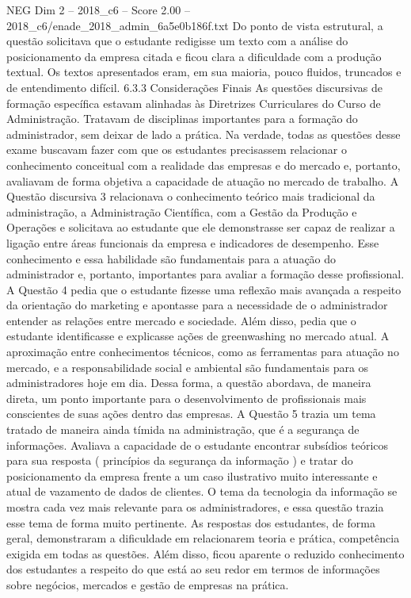 \begin{textsample}{NEG Dim 2 – 2018\_c6 – Score 2.00 – 2018\_c6/enade\_2018\_admin\_6a5e0b186f.txt}
Do ponto de vista estrutural, a questão solicitava que o estudante redigisse um texto com a análise do posicionamento da empresa citada e ficou clara a dificuldade com a produção textual.
Os textos apresentados eram, em sua maioria, pouco fluidos, truncados e de entendimento difícil. 6.3.3 Considerações Finais As questões discursivas de formação específica estavam alinhadas às Diretrizes Curriculares do Curso de Administração.
Tratavam de disciplinas importantes para a formação do administrador, sem deixar de lado a prática.
Na verdade, todas as questões desse exame buscavam fazer com que os estudantes precisassem relacionar o conhecimento conceitual com a realidade das empresas e do mercado e, portanto, avaliavam de forma objetiva a capacidade de atuação no mercado de trabalho.
A Questão discursiva 3 relacionava o conhecimento teórico mais tradicional da administração, a Administração Científica, com a Gestão da Produção e Operações e solicitava ao estudante que ele demonstrasse ser capaz de realizar a ligação entre áreas funcionais da empresa e indicadores de desempenho.
Esse conhecimento e essa habilidade são fundamentais para a atuação do administrador e, portanto, importantes para avaliar a formação desse profissional.
A Questão 4 pedia que o estudante fizesse uma reflexão mais avançada a respeito da orientação do marketing e apontasse para a necessidade de o administrador entender as relações entre mercado e sociedade.
Além disso, pedia que o estudante identificasse e explicasse ações de greenwashing no mercado atual.
A aproximação entre conhecimentos técnicos, como as ferramentas para atuação no mercado, e a responsabilidade social e ambiental são fundamentais para os administradores hoje em dia.
Dessa forma, a questão abordava, de maneira direta, um ponto importante para o desenvolvimento de profissionais mais conscientes de suas ações dentro das empresas.
A Questão 5 trazia um tema tratado de maneira ainda tímida na administração, que é a segurança de informações.
Avaliava a capacidade de o estudante encontrar subsídios teóricos para sua resposta ( princípios da segurança da informação ) e tratar do posicionamento da empresa frente a um caso ilustrativo muito interessante e atual de vazamento de dados de clientes.
O tema da tecnologia da informação se mostra cada vez mais relevante para os administradores, e essa questão trazia esse tema de forma muito pertinente.
As respostas dos estudantes, de forma geral, demonstraram a dificuldade em relacionarem teoria e prática, competência exigida em todas as questões.
Além disso, ficou aparente o reduzido conhecimento dos estudantes a respeito do que está ao seu redor em termos de informações sobre negócios, mercados e gestão de empresas na prática.

\end{textsample}
